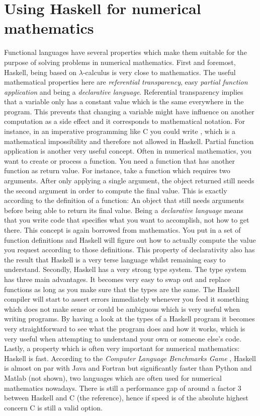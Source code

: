 \section{Using Haskell for numerical mathematics}
Functional languages have several properties which make them suitable for the purpose of solving problems in numerical mathematics. First and foremost, Haskell, being based on $\lambda$-calculus is very close to mathematics. The useful mathematical properties here are \textit{referential transparency}, easy \textit{partial function application} and being a \textit{declarative language}. 
Referential transparency implies that a variable only has a constant value which is the same everywhere in the program. This prevents that changing a variable might have influence on another computation as a side effect and it corresponds to mathematical notation. For instance, in an imperative programming like C you could write , which is a mathematical impossibility and therefore not allowed in Haskell. 
Partial function application is another very useful concept. Often in numerical mathematics, you want to create or process a function. You need a function that has another function as return value. For instance, take a function which requires two arguments. After only applying a single argument, the object returned still needs the second argument in order to compute the final value. This is exactly according to the definition of a function: An object that still needs arguments before being able to return its final value.
Being a \textit{declarative language} means that you write code that specifies what you want to accomplish, not how to get there. This concept is again borrowed from mathematics. You put in a set of function definitions and Haskell will figure out how to actually compute the value you request according to those definitions. This property of declarativity also has the result that Haskell is a very terse language whilst remaining easy to understand.
Secondly, Haskell has a very strong type system. The type system has three main advantages. It becomes very easy to swap out and replace functions as long as you make sure that the types are the same. The Haskell compiler will start to assert errors immediately whenever you feed it something which does not make sense or could be ambiguous which is very useful when writing programs. By having a look at the types of a Haskell program it becomes very straightforward to see what the program does and how it works, which is very useful when attempting to understand your own or someone else's code.
Lastly, a property which is often very important for numerical mathematics: Haskell is fast. According to the \textit{Computer Language Benchmarks Game} \cite{Bench}, Haskell is almost on par with Java and Fortran but significantly faster than Python and Matlab (not shown), two languages which are often used for numerical mathematics nowadays. There is still a performance gap of around a factor 3 between Haskell and C (the reference), hence if speed is of the absolute highest concern C is still a valid option.

